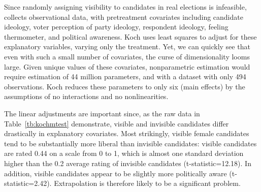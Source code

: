 \documentclass[11pt,titlepage]{article}
\begin{document}
Since randomly assigning visibility to candidates in real elections is
infeasible, \citet{Koch02} collects observational data, with
pretreatment covariates including candidate ideology, voter perception
of party ideology, respondent ideology, feeling thermometer, and
political awareness.  Koch uses least squares to adjust for these
explanatory variables, varying only the treatment.  Yet, we can
quickly see that even with such a small number of covariates, the
curse of dimensionality looms large.  Given unique values of these
covariates, nonparametric estimation would require estimation of 44
million parameters, and with a dataset with only 494 observations.
Koch reduces these parameters to only six (main effects) by the
assumptions of no interactions and no nonlinearities.

The linear adjustments are important since, as the raw data in
Table~\ref{tb:kochmtest} demonstrate, visible and invisible candidates
differ drastically in explanatory covariates.  Most strikingly,
visible female candidates tend to be substantially more liberal than
invisible candidates: visible candidates are rated 0.44 on a scale
from 0 to 1, which is almost one standard deviation higher than the
0.2 average rating of invisible candidates (t-statistic=12.18).  In
addition, visible candidates appear to be slightly more politically
aware (t-statistic=2.42).  Extrapolation is therefore likely to be a
significant problem.  
\end{document}
